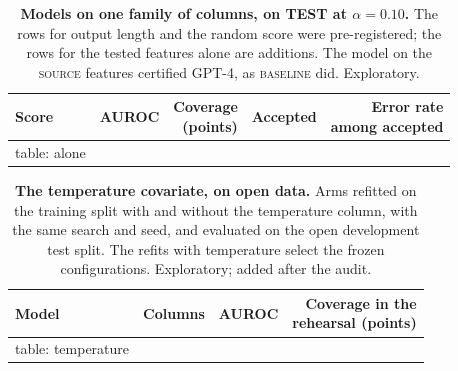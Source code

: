 \documentclass[11pt]{article}
\newcommand{\arm}[1]{\textsc{#1}}
\begin{document}
\begin{table}[h]
\centering
\small
\caption{\textbf{Models on one family of columns, on TEST at $\alpha = 0.10$.} The rows for output length and the random score were pre-registered; the rows for the tested features alone are additions. The model on the \arm{source} features certified GPT-4, as \arm{baseline} did. Exploratory.}
\label{tab:alone}
\begin{tabular}{@{}lrrrr@{}}
\toprule
Score & AUROC & \shortstack[r]{Coverage\\(points)} & Accepted & \shortstack[r]{Error rate\\among accepted} \\
\midrule
{{table: alone}}
\bottomrule
\end{tabular}
\end{table}

\begin{table}[h]
\centering
\small
\caption{\textbf{The temperature covariate, on open data.} Arms refitted on the training split with and without the temperature column, with the same search and seed, and evaluated on the open development test split. The refits with temperature select the frozen configurations. Exploratory; added after the audit.}
\label{tab:temperature}
\begin{tabular}{@{}lrrr@{}}
\toprule
Model & Columns & AUROC & \shortstack[r]{Coverage in the\\rehearsal (points)} \\
\midrule
{{table: temperature}}
\bottomrule
\end{tabular}
\end{table}
\end{document}
